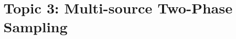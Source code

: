 \documentclass[12pt]{article}
\newcommand{\bx}{\mathbf{x}}
\begin{document}
%


\section{Topic 3: Multi-source Two-Phase Sampling}




\end{document}
